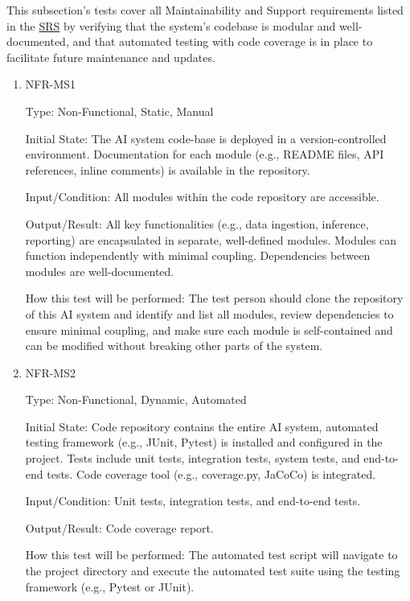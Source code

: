 \documentclass[12pt, titlepage]{article}
\begin{document}
\begin{enumerate}
\begin{enumerate}
\begin{enumerate}
\begin{enumerate}
This subsection's tests cover all Maintainability and Support requirements listed in the \href{https://github.com/RezaJodeiri/CXR-Capstone/blob/main/docs/SRS/SRS.pdf}{SRS} \citep{SRS}
 by verifying that the system's codebase is modular and well-documented, and that automated testing with code coverage is in place to facilitate future maintenance and updates.

\begin{enumerate}

\item{NFR-MS1\\}\label{NFR-MS1}

Type: Non-Functional, Static, Manual

Initial State: The AI system code-base is deployed in a version-controlled environment. Documentation for each module (e.g., README files, API references, inline comments) is available in the repository.

Input/Condition: All modules within the code repository are accessible.

Output/Result: All key functionalities (e.g., data ingestion, inference, reporting) are encapsulated in separate, well-defined modules. Modules can function independently with minimal coupling. Dependencies between modules are well-documented.

How this test will be performed: The test person should clone the repository of this AI system and identify and list all modules, review dependencies to ensure minimal coupling, and make sure each module is self-contained and can be modified without breaking other parts of the system.

\item{NFR-MS2\\}\label{NFR-MS2}

Type: Non-Functional, Dynamic, Automated

Initial State: Code repository contains the entire AI system, automated testing framework (e.g., JUnit, Pytest) is installed and configured in the project. Tests include unit tests, integration tests, system tests, and end-to-end tests. Code coverage tool (e.g., coverage.py, JaCoCo) is integrated.

Input/Condition: Unit tests, integration tests, and end-to-end tests.

Output/Result: Code coverage report.

How this test will be performed: The automated test script will navigate to the project directory and execute the automated test suite using the testing framework (e.g., Pytest or JUnit).


\end{enumerate}
\end{enumerate}
\end{enumerate}
\end{enumerate}
\end{enumerate}
\end{document}
